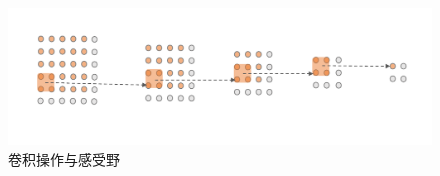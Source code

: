 \begin{figure}[h]
  \centering
  \includegraphics[width=1.0\linewidth]{Img/RF.pdf}
  \caption{卷积操作与感受野}
  \label{fig:RF}
\end{figure}
